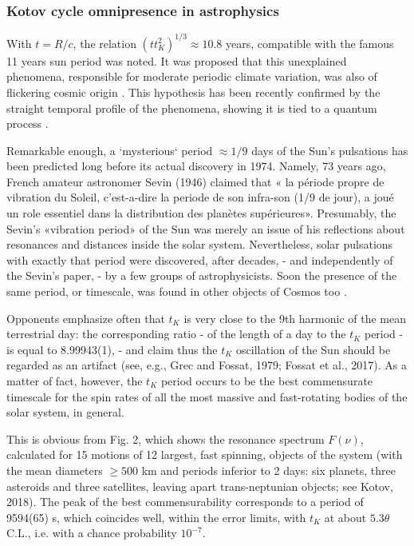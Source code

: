 \documentclass[twoside,draft]{article}
\begin{document}
\begin{sloppypar}
{\subsubsection{Kotov cycle omnipresence in astrophysics}

With $t = R/c$, the relation $(t t_{K}^2)^{1/3} \approx 10.8$ years, compatible with the famous 11 years sun period
was noted. It was proposed that this unexplained phenomena, responsible for moderate periodic
climate variation, was also of flickering cosmic origin \cite{Sanchez3}. This hypothesis has been recently
confirmed by the straight temporal profile of the phenomena, showing it is tied to a quantum
process \cite{Kotov2}.

Remarkable enough, a `mysterious` period $\approx 1/9$ days of the Sun's pulsations has been predicted
long before its actual discovery in 1974. Namely, 73 years ago, French amateur astronomer Sevin
(1946) claimed that « la p\'{e}riode propre de vibration du Soleil, c'est-a-dire la periode de son infra-son (1/9 de jour), a jou\'{e} un role essentiel dans la distribution des plan\`{e}tes sup\'{e}rieures». Presumably,
the Sevin's «vibration period» of the Sun was merely an issue of his reflections about resonances
and distances inside the solar system. Nevertheless, solar pulsations with exactly that period were
discovered, after decades, - and independently of the Sevin's paper, - by a few groups of
astrophysicists. Soon the presence of the same period, or timescale, was found in other objects of
Cosmos too \cite{Kotov1}.

Opponents emphasize often that $t_{K}$ is very close to the 9th harmonic of the mean terrestrial day: the corresponding ratio - of the length of a day to the $t_{K}$ period - is equal to 8.99943(1), - and claim
thus the $t_{K}$ oscillation of the Sun should be regarded as an artifact (see, e.g., Grec and Fossat, 1979;
Fossat et al., 2017). As a matter of fact, however, the $t_{K}$ period occurs to be the best commensurate
timescale for the spin rates of all the most massive and fast-rotating bodies of the solar system, in
general.

This is obvious from Fig. 2, which shows the resonance spectrum $F( \nu )$, calculated for 15
motions of 12 largest, fast spinning, objects of the system (with the mean diameters $\geq 500$ km and
periods inferior to 2 days: six planets, three asteroids and three satellites, leaving apart trans-neptunian
objects; see Kotov, 2018). The peak of the best commensurability corresponds to a period of
9594(65) s, which coincides well, within the error limits, with $t_K$ at about $5.3 \theta$ C.L., i.e. with a
chance probability $10^{-7}$.

}
\end{sloppypar}
\end{document}

